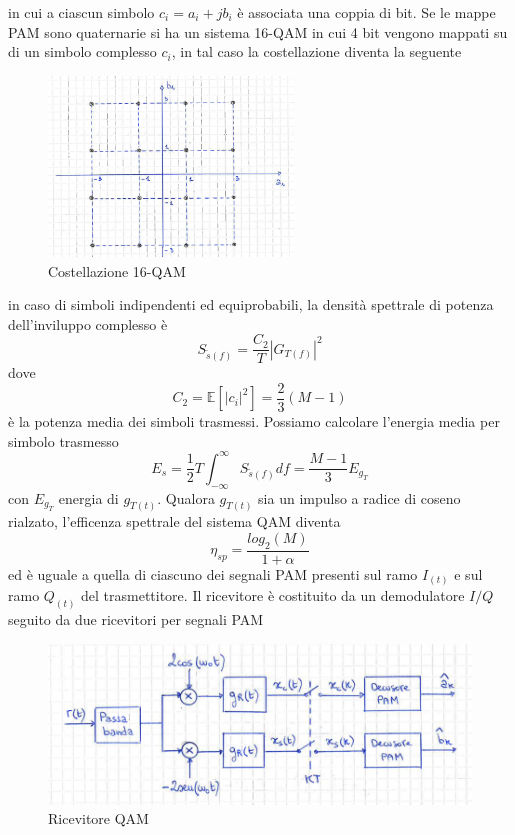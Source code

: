         in cui a ciascun simbolo $c_i = a_i +jb_i$ è associata una coppia di bit. Se le mappe PAM sono quaternarie si ha un sistema 
        16-QAM in cui 4 bit vengono mappati su di un simbolo complesso $c_i$, in tal caso la costellazione diventa la seguente
        \begin{figure}[H]
            \centering
            \includegraphics[width = 6.5cm]{media/costellazione 16qam.png}
            \caption{Costellazione 16-QAM}
        \end{figure}
        in caso di simboli indipendenti ed equiprobabili, la densità spettrale di potenza dell'inviluppo complesso è 
        \[
            S_{\tilde{s}(f)} = \frac{C_2}{T}\left|G_{T(f)}\right|^2    
        \]
        dove 
        \[
            C_2 = \mathbb{E}[\left|c_i\right|^2] = \frac{2}{3}(M-1)    
        \]
        è la potenza media dei simboli trasmessi. Possiamo calcolare l'energia media per simbolo trasmesso
        \[
            E_s = \frac{1}{2}T\int_{-\infty}^{\infty}S_{\tilde{s}(f)} df = \frac{M-1}{3}E_{g_T}
        \]
        con $E_{g_T}$ energia di $g_{T(t)}$. Qualora $g_{T(t)}$ sia un impulso a radice di coseno rialzato, l'efficenza spettrale del 
        sistema QAM diventa 
        \[
            \eta_{sp} = \frac{log_2(M)}{1+\alpha}  
        \]
        ed è uguale a quella di ciascuno dei segnali PAM presenti sul ramo $I_{(t)}$ e sul ramo $Q_{(t)}$ del trasmettitore.
        Il ricevitore è costituito da un demodulatore $I/Q$ seguito da due ricevitori per segnali PAM
        \begin{figure}[H]
            \centering
            \includegraphics[width = 12cm]{media/ricevitore qam 2.png}
            \caption{Ricevitore QAM}
        \end{figure}
